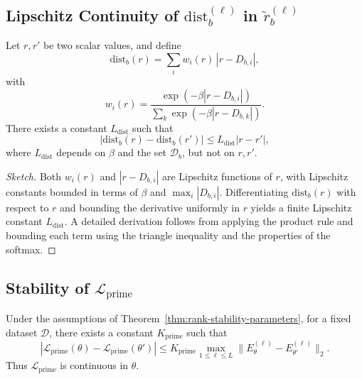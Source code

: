 \documentclass[11pt]{article}
\begin{document}
\subsection{Lipschitz Continuity of $\mathrm{dist}_b^{(\ell)}$ in $\tilde{r}_b^{(\ell)}$}

\begin{lemma}
\label{lem:dist-lipschitz}
Let $r,r'$ be two scalar values, and define
\[
\mathrm{dist}_b(r) = \sum_i w_i(r)\,|r - D_{b,i}|,
\]
with
\[
w_i(r) = \frac{\exp(-\beta |r - D_{b,i}|)}{\sum_k \exp(-\beta |r - D_{b,k}|)}.
\]
There exists a constant $L_{\mathrm{dist}}$ such that
\[
|\mathrm{dist}_b(r) - \mathrm{dist}_b(r')|
\le L_{\mathrm{dist}} |r - r'|,
\]
where $L_{\mathrm{dist}}$ depends on $\beta$ and the set $\mathcal{D}_b$, but not on $r,r'$.
\end{lemma}

\begin{proof}[Sketch]
Both $w_i(r)$ and $|r - D_{b,i}|$ are Lipschitz functions of $r$, with Lipschitz constants bounded in terms of $\beta$ and $\max_i |D_{b,i}|$. Differentiating $\mathrm{dist}_b(r)$ with respect to $r$ and bounding the derivative uniformly in $r$ yields a finite Lipschitz constant $L_{\mathrm{dist}}$. A detailed derivation follows from applying the product rule and bounding each term using the triangle inequality and the properties of the softmax.
\end{proof}

\subsection{Stability of $\mathcal{L}_{\mathrm{prime}}$}

\begin{theorem}
\label{thm:Lprime-stability}
Under the assumptions of Theorem~\ref{thm:rank-stability-parameters}, for a fixed dataset $\mathcal{D}$, there exists a constant $K_{\mathrm{prime}}$ such that
\[
|\mathcal{L}_{\mathrm{prime}}(\theta) - \mathcal{L}_{\mathrm{prime}}(\theta')|
\le K_{\mathrm{prime}}
\max_{1\le \ell \le L} \|E^{(\ell)}_\theta - E^{(\ell)}_{\theta'}\|_2.
\]
Thus $\mathcal{L}_{\mathrm{prime}}$ is continuous in $\theta$.
\end{theorem}
\end{document}

